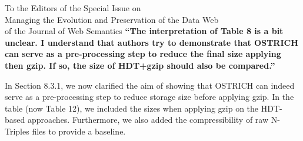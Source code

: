 \documentclass{letter}
\begin{document}
\begin{letter}{To the Editors of the Special Issue on\\Managing the Evolution and Preservation of the Data Web\\of the Journal of Web Semantics}
\textbf{\enquote{The interpretation of Table 8 is a bit unclear. I understand that authors try to demonstrate that OSTRICH can serve as a pre-processing step to reduce the final size applying then gzip. If so, the size of HDT+gzip should also be compared.}}

In Section 8.3.1, we now clarified the aim of showing that OSTRICH can indeed serve as a pre-processing step to reduce storage size before applying gzip.
In the table (now Table 12), we included the sizes when applying gzip on the HDT-based approaches.
Furthermore, we also added the compressibility of raw N-Triples files to provide a baseline.

\end{letter}
\end{document}
